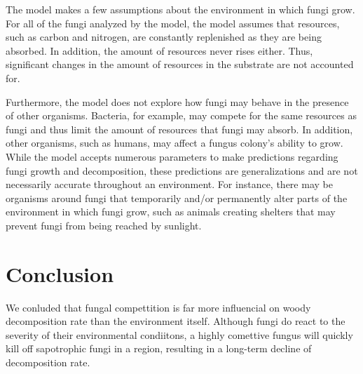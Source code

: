 \documentclass[twocolumn]{article} %
\begin{document}
The model makes a few assumptions about the environment in which fungi grow. For all of the fungi analyzed by the model, the model assumes that resources, such as carbon and nitrogen, are constantly replenished as they are being absorbed. In addition, the amount of resources never rises either. Thus, significant changes in the amount of resources in the substrate are not accounted for.

Furthermore, the model does not explore how fungi may behave in the presence of other organisms. Bacteria, for example, may compete for the same resources as fungi and thus limit the amount of resources that fungi may absorb. In addition, other organisms, such as humans, may affect a fungus colony’s ability to grow. While the model accepts numerous parameters to make predictions regarding fungi growth and decomposition, these predictions are generalizations and are not necessarily accurate throughout an environment. For instance, there may be organisms around fungi that temporarily and/or permanently alter parts of the environment in which fungi grow, such as animals creating shelters that may prevent fungi from being reached by sunlight. 

\newpage
\section{Conclusion}

We conluded that fungal compettition is far more influencial on woody decomposition rate than the environment itself. Although fungi do react to the severity of their environmental condiitons, a highly comettive fungus will quickly kill off sapotrophic fungi in a region, resulting in a long-term decline of decomposition rate.




\end{document}

